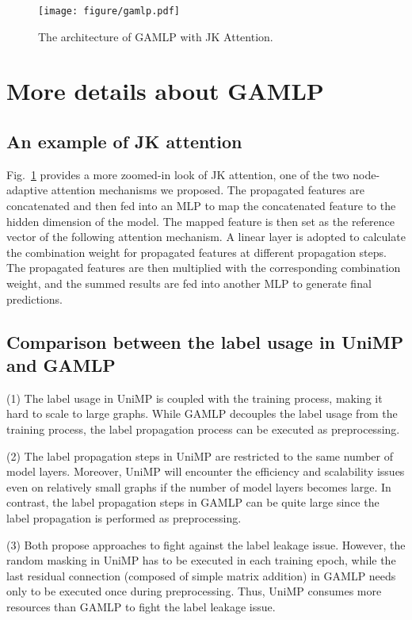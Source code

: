 \documentclass[sigconf]{acmart}
\begin{document}
\clearpage

\appendix
\begin{figure}[tpb!]
    \vspace{-4mm}
	\centering
	\texttt{[image: figure/gamlp.pdf]}
	\caption{The architecture of GAMLP with JK Attention.}
	\label{fig:gmlp}
\end{figure}



\section{More details about GAMLP}
\subsection{An example of JK attention}
Fig.~\ref{fig:gmlp} provides a more zoomed-in look of JK attention, one of the two node-adaptive attention mechanisms we proposed.
The propagated features are concatenated and then fed into an MLP to map the concatenated feature to the hidden dimension of the model.
The mapped feature is then set as the reference vector of the following attention mechanism.
A linear layer is adopted to calculate the combination weight for propagated features at different propagation steps.
The propagated features are then multiplied with the corresponding combination weight, and the summed results are fed into another MLP to generate final predictions.


\subsection{Comparison between the label usage in UniMP and GAMLP}
(1) The label usage in UniMP is coupled with the training process, making it hard to scale to large graphs. While GAMLP decouples the label usage from the training process, the label propagation process can be executed as preprocessing. 

\noindent(2) The label propagation steps in UniMP are restricted to the same number of model layers. Moreover, UniMP will encounter the efficiency and scalability issues even on relatively small graphs if the number of model layers becomes large. 
In contrast, the label propagation steps in GAMLP can be quite large since the label propagation is performed as preprocessing. 

\noindent(3) Both propose approaches to fight against the label leakage issue. However, the random masking in UniMP has to be executed in each training epoch, while the last residual connection (composed of simple matrix addition) in GAMLP needs only to be executed once during preprocessing. Thus, UniMP consumes more resources than GAMLP to fight the label leakage issue.
\end{document}

